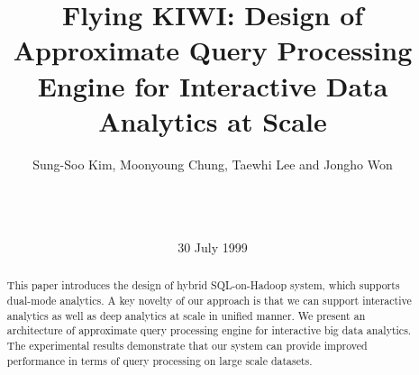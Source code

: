 \documentclass{sig-alternate-05-2015}
\begin{document}






%

\title{Flying KIWI: Design of Approximate Query Processing Engine for Interactive Data Analytics at Scale }


\author{
\alignauthor
Sung-Soo Kim, Moonyoung Chung, Taewhi Lee and Jongho Won \\
       \\
       \\
       \\
}

\date{30 July 1999}

\maketitle
\begin{abstract}
This paper introduces the design of hybrid SQL-on-Hadoop system, which supports dual-mode analytics. %
A key novelty of our approach is that we can support interactive analytics as well as deep analytics at scale in unified manner.
We present an architecture of approximate query processing engine for interactive big data analytics. 
The experimental results demonstrate that our system can provide improved performance in terms of  query processing on large scale datasets.
\end{abstract}
\end{document}
